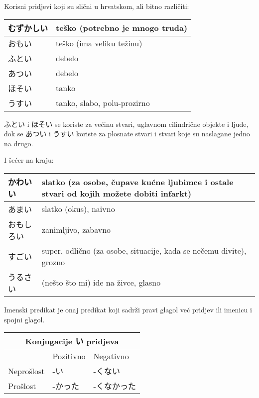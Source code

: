 \vspace{10pt}
Korisni pridjevi koji su slični u hrvatskom, ali bitno različiti:
	
	\vspace{10pt}
	\begin{tabular}{|l|l|}
		\hline
		むずかしい&teško (potrebno je mnogo truda)\\\hline
		おもい&teško (ima veliku težinu)\\\hline
		ふとい&debelo\\\hline
		あつい&debelo\\\hline
		ほそい&tanko\\\hline
		うすい&tanko, slabo, polu-prozirno\\\hline
	\end{tabular}
	
	\vspace{10pt}
	ふとい i ほそい se koriste za većinu stvari, uglavnom cilindrične objekte i ljude, dok se あつい i うすい koriste za plosnate stvari i stvari koje su naslagane jedno na drugo.

	
	\vspace{10pt}
	I šećer na kraju:
	
	\vspace{10pt}
	\begin{tabular}{|l|l|}
		\hline
		かわいい&slatko (za osobe, čupave kućne ljubimce i ostale stvari od kojih možete dobiti infarkt)\\\hline
		あまい&slatko (okus), naivno\\\hline
		おもしろい&zanimljivo, zabavno\\\hline
		すごい&super, odlično (za osobe, situacije, kada se nečemu divite), grozno\\\hline
		うるさい&(nešto što mi) ide na živce, glasno\\\hline
	\end{tabular}
	\vspace{10pt}
	
Imenski predikat je onaj predikat koji sadrži pravi glagol već pridjev ili imenicu i spojni glagol.

	\begin{reibun}
	\end{reibun}
	
	
	\vspace{10pt}
	\begin{tabular}{|l||l|l|}
		\hline
		\multicolumn{3}{c}{Konjugacije い pridjeva}\\\hline
		 &Pozitivno&Negativno\\\hline
		Neprošlost&-い&-くない\\\hline
		Prošlost&-かった&-くなかった\\\hline
	\end{tabular}

